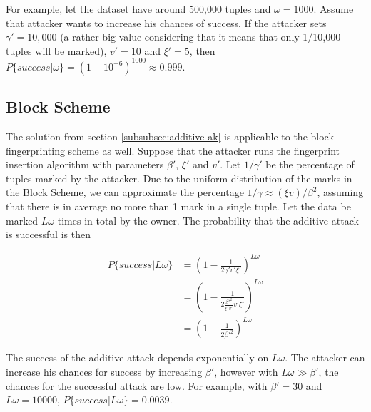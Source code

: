 For example, let the dataset have around 500,000 tuples and  $\omega=1000$. 
Assume that attacker wants to increase his chances of success.
If the attacker sets $\gamma'=10,000$ (a rather big value considering that it means that only 1/10,000 tuples will be marked), $v'=10$ and $\xi'=5$, then $P\{success|\omega\}=(1-10^{-6})^1000 \approx 0.999$.



\subsection{Block Scheme}
The solution from section \ref{subsubsec:additive-ak} is applicable to the block fingerprinting scheme as well. 
Suppose that the attacker runs the fingerprint insertion algorithm with parameters $\beta'$, $\xi'$ and $v'$.  
Let $1/\gamma'$ be the percentage of tuples marked by the attacker.
Due to the uniform distribution of the marks in the Block Scheme, we can approximate the percentage $1/\gamma \approx (\xi v)/\beta^2$, assuming that there is in average no more than 1 mark in a single tuple.
Let the data be marked $L\omega$ times in total by the owner.
The probability that the additive attack is successful is then 

\begin{equation}
\begin{aligned}
    P\{success|L\omega\}&=(1-\frac{1}{2\gamma'v'\xi'})^{L\omega} \\
        &=(1-\frac{1}{2\frac{\beta'^2}{\xi'v'}v'\xi'})^{L\omega} \\
        &=(1-\frac{1}{2\beta'^2})^{L\omega}
\end{aligned}
\end{equation}

The success of the additive attack depends exponentially on $L\omega$.
The attacker can increase his chances for success by increasing $\beta'$, however with $L\omega \gg \beta'$, the chances for the successful attack are low.
For example, with $\beta'=30$ and $L\omega=10000$, $P\{success|L\omega\}=0.0039$.

